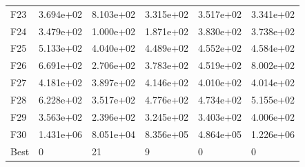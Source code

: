 \begin{tabular}{llllll}
F23  &  3.694e+02 &  8.103e+02 &  3.315e+02 &  3.517e+02 &  3.341e+02 \\
F24  &  3.479e+02 &  1.000e+02 &  1.871e+02 &  3.830e+02 &  3.738e+02 \\
F25  &  5.133e+02 &  4.040e+02 &  4.489e+02 &  4.552e+02 &  4.584e+02 \\
F26  &  6.691e+02 &  2.706e+02 &  3.783e+02 &  4.519e+02 &  8.002e+02 \\
F27  &  4.181e+02 &  3.897e+02 &  4.146e+02 &  4.010e+02 &  4.014e+02 \\
F28  &  6.228e+02 &  3.517e+02 &  4.776e+02 &  4.734e+02 &  5.155e+02 \\
F29  &  3.563e+02 &  2.396e+02 &  3.245e+02 &  3.403e+02 &  4.006e+02 \\
F30  &  1.431e+06 &  8.051e+04 &  8.356e+05 &  4.864e+05 &  1.226e+06 \\
Best &          0 &         21 &          9 &          0 &          0 \\
\bottomrule
\end{tabular}

